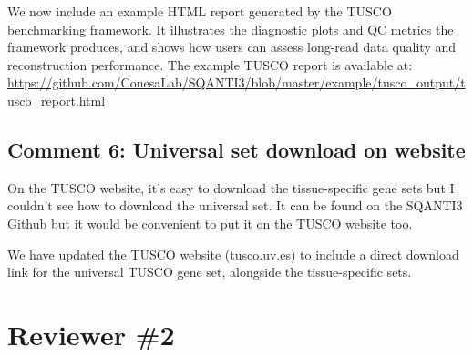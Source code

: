 \documentclass[11pt]{article}
\begin{document}
\begin{responseboxnew}
We now include an example HTML report generated by the TUSCO benchmarking framework. It illustrates the diagnostic plots and QC metrics the framework produces, and shows how users can assess long-read data quality and reconstruction performance. The example TUSCO report is available at: \url{https://github.com/ConesaLab/SQANTI3/blob/master/example/tusco_output/tusco_report.html}
\end{responseboxnew}

\subsection{Comment 6: Universal set download on website}

\begin{reviewercomment}
On the TUSCO website, it's easy to download the tissue-specific gene sets but I couldn't see how to download the universal set. It can be found on the SQANTI3 Github but it would be convenient to put it on the TUSCO website too.
\end{reviewercomment}

\begin{responseboxnew}
We have updated the TUSCO website (tusco.uv.es) to include a direct download link for the universal TUSCO gene set, alongside the tissue-specific sets.
\end{responseboxnew}

\newpage

\section{Reviewer \#2}
\end{document}
